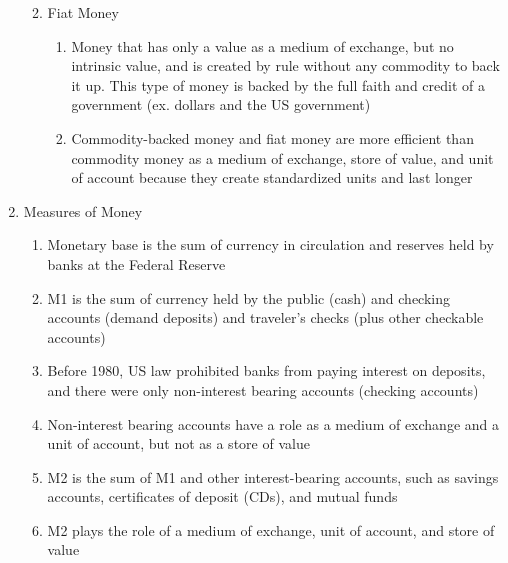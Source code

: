 \documentclass[12pt]{article}
\begin{document}
\begin{enumerate}
\begin{enumerate}
\begin{enumerate}
            \end{enumerate}

          \item Fiat Money

            \begin{enumerate}

              \item Money that has only a value as a medium of exchange, but no intrinsic value, and is created by rule without any commodity to back it up. This type of money is backed by the full faith and credit of a government (ex. dollars and the US government)

              \item Commodity-backed money and fiat money are more efficient than commodity money as a medium of exchange, store of value, and unit of account because they create standardized units and last longer

            \end{enumerate}

        \end{enumerate}

      \item Measures of Money

        \begin{enumerate}

          \item Monetary base is the sum of currency in circulation and reserves held by banks at the Federal Reserve

          \item M1 is the sum of currency held by the public (cash) and checking accounts (demand deposits) and traveler's checks (plus other checkable accounts)

          \item Before 1980, US law prohibited banks from paying interest on deposits, and there were only non-interest bearing accounts (checking accounts)

          \item Non-interest bearing accounts have a role as a medium of exchange and a unit of account, but not as a store of value

          \item M2 is the sum of M1 and other interest-bearing accounts, such as savings accounts, certificates of deposit (CDs), and mutual funds

          \item M2 plays the role of a medium of exchange, unit of account, and store of value


\end{enumerate}
\end{enumerate}
\end{document}
